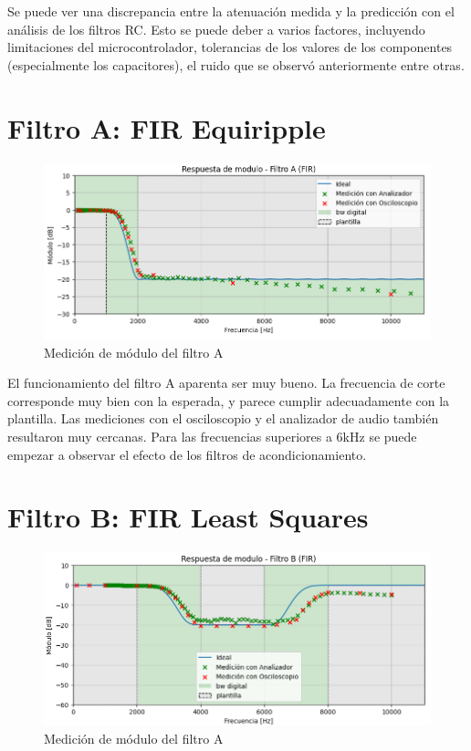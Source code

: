 \documentclass[11pt,a4paper]{report}
\begin{document}
Se puede ver una discrepancia entre la atenuación medida y la predicción con el análisis de los filtros RC. Esto se puede deber a varios factores, incluyendo limitaciones del microcontrolador, tolerancias de los valores de los componentes (especialmente los capacitores), el ruido que se observó anteriormente entre otras.

\section{Filtro A: FIR Equiripple}

\begin{figure}[h]
    \centering
    \includegraphics[scale=0.7]{figs/filtro_a.png}
    \caption{Medición de módulo del filtro A}
\end{figure}

El funcionamiento del filtro A aparenta ser muy bueno. La frecuencia de corte corresponde muy bien con la esperada, y parece cumplir adecuadamente con la plantilla. Las mediciones con el osciloscopio y el analizador de audio también resultaron muy cercanas. Para las frecuencias superiores a 6kHz se puede empezar a observar el efecto de los filtros de acondicionamiento.


\section{Filtro B: FIR Least Squares}

\begin{figure}[h]
    \centering
    \includegraphics[scale=0.7]{figs/filtro_b.png}
    \caption{Medición de módulo del filtro A}
\end{figure}
\end{document}
